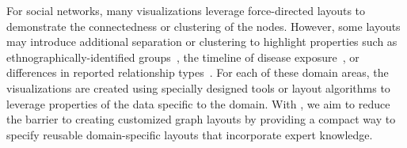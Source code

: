 For social networks, many visualizations leverage force-directed layouts
to demonstrate the connectedness or clustering of the nodes. However, some
layouts may introduce additional separation or clustering
to highlight properties such as ethnographically-identified
groups~\cite{rothenberg1998using},
the timeline of disease
exposure~\cite{fitzpatrick2001preventable,mcelroy2003network},
or differences in reported relationship types~\cite{fu2011hiv}.
For each of these domain areas, the visualizations are created using specially
designed tools or layout algorithms to leverage properties of the data
specific to the domain. With \projectname, we aim to reduce the barrier to
creating customized graph layouts by providing a compact way to specify
reusable domain-specific layouts that incorporate expert knowledge.





